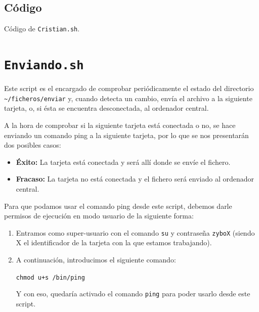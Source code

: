 \newpage
\subsection{Código}

\begin{center}
	Código de \texttt{Cristian.sh}.
\end{center}

\newpage
\section{\texttt{Enviando.sh}}
\hypertarget{ScriptEnviando}{}
Este script es el encargado de comprobar periódicamente el estado del directorio\\ \texttt{\textasciitilde/ficheros/enviar} y, cuando detecta un cambio, envía el archivo a la siguiente tarjeta, o, si ésta se encuentra desconectada, al ordenador central.

A la hora de comprobar si la siguiente tarjeta está conectada o no, se hace enviando un comando ping a la siguiente tarjeta, por lo que se nos presentarán dos posibles casos:
\begin{itemize}
	\item \textbf{Éxito:} La tarjeta está conectada y será allí donde se envíe el fichero.
	\item \textbf{Fracaso:} La tarjeta no está conectada y el fichero será enviado al ordenador central.
\end{itemize}

Para que podamos usar el comando ping desde este script, debemos darle permisos de ejecución en modo usuario de la siguiente forma:
\begin{enumerate}
	\item Entramos como super-usuario con el comando \texttt{su} y contraseña \texttt{zyboX} (siendo X el identificador de la tarjeta con la que estamos trabajando).
	\item A continuación, introducimos el siguiente comando:
	\begin{center}
		\texttt{chmod u+s /bin/ping}
	\end{center}
	Y con eso, quedaría activado el comando \texttt{ping} para poder usarlo desde este script.
\end{enumerate}

\newpage
